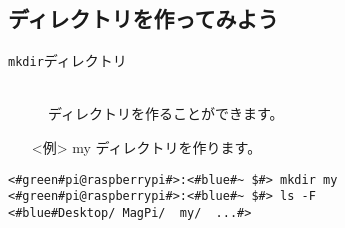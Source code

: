 \subsection{ディレクトリを作ってみよう}
\begin{description}
\item[\texttt{mkdir}\textvisiblespace ディレクトリ]\mbox{}\\
ディレクトリを作ることができます。
\end{description}
\begin{itemize}
\item[<例>]my ディレクトリを作ります。
\end{itemize}
\begin{lstlisting}[caption=mkdirの例, label=mkdir]
<#green#pi@raspberrypi#>:<#blue#~ $#> mkdir my
<#green#pi@raspberrypi#>:<#blue#~ $#> ls -F
<#blue#Desktop/	MagPi/	my/	 ...#>
\end{lstlisting}
\begin{tcolorbox}[title=\useOmetoi]
\begin{enumerate}
\end{enumerate}
\end{tcolorbox}
